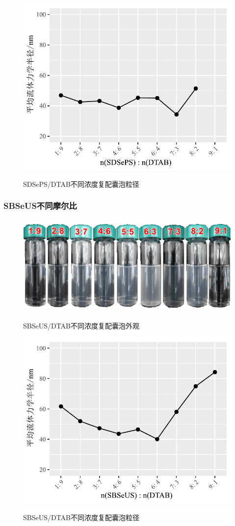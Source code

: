 \documentclass[bachelor,fandolfonts,replaceperiod]{jnuthesis}
\begin{document}
    \begin{figure}[htbp]
        \centering
        \includegraphics[width=.6\textwidth]{figure/SDSePS-DTAB-ratio-fig.pdf}\\
        \caption{SDSePS/DTAB不同浓度复配囊泡粒径}\label{fig:SDSePS-DTAB-ratio-fig}
    \end{figure}
    \subsubsection{SBSeUS不同摩尔比}
    \begin{figure}[htbp]
        \centering
        \includegraphics[height=5cm]{figure/SBSeUS-DTAB-ratio.png}\\
        \caption{SBSeUS/DTAB不同浓度复配囊泡外观}\label{fig:SBSeUS-DTAB-ratio}
    \end{figure}

    \begin{figure}[htbp]
        \centering
        \includegraphics[width=.6\textwidth]{figure/SBSeUS-DTAB-ratio-fig.pdf}\\
        \caption{SBSeUS/DTAB不同浓度复配囊泡粒径}\label{fig:SBSeUS-DTAB-ratio-fig}
    \end{figure}
        
\end{document}
